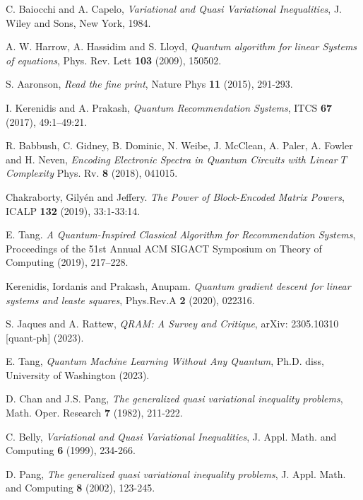 \documentclass[10pt,twoside,reqno]{amsart} %
\theoremstyle{plain}
\theoremstyle{definition}
\begin{document}
\bigskip

\begin{thebibliography}{0}

C. Baiocchi and A. Capelo, 
{\it Variational and Quasi Variational Inequalities}, 
J. Wiley and Sons, 
New York, 
1984.

A. W. Harrow, A. Hassidim and S. Lloyd,
{\it Quantum algorithm for linear Systems of equations},
Phys. Rev. Lett
{\bf 103} (2009),
150502.

S. Aaronson,
{\it Read the fine print},
Nature Phys
{\bf 11} (2015),
291-293.

I. Kerenidis and A. Prakash,
{\it Quantum Recommendation Systems},
ITCS
{\bf 67} (2017),
49:1--49:21.

R. Babbush, C. Gidney, B. Dominic, N. Weibe, J. McClean, A. Paler, A. Fowler
and H. Neven,
{\it Encoding Electronic Spectra in Quantum Circuits with Linear $T$ Complexity}
Phys. Rv.
{\bf 8} (2018),
041015.

Chakraborty, Gily{\'en} and Jeffery. {\it The Power of Block-Encoded Matrix
Powers}, ICALP {\bf 132} (2019), 33:1-33:14.

E. Tang. {\it A Quantum-Inspired Classical Algorithm for Recommendation Systems},
Proceedings of the 51st Annual ACM SIGACT Symposium on Theory of Computing (2019),
217--228.

Kerenidis, Iordanis and Prakash, Anupam. {\it Quantum gradient descent for
linear systems and leaste squares}, Phys.Rev.A {\bf 2} (2020), 022316.

S. Jaques and A. Rattew,
{\it QRAM: A Survey and Critique},
arXiv: 2305.10310 [quant-ph] (2023).

E. Tang,
{\it Quantum Machine Learning Without Any Quantum},
Ph.D. diss, University of Washington (2023).

D. Chan and J.S. Pang, 
{\it The generalized quasi variational inequality problems}, 
Math. Oper. Research 
{\bf 7} (1982), 
211-222.

C. Belly, 
{\it Variational and Quasi Variational Inequalities}, 
J. Appl. Math. and Computing 
{\bf 6} (1999), 
234-266.

D. Pang, 
{\it The generalized quasi variational inequality problems}, 
J. Appl. Math. and Computing 
{\bf 8} (2002), 
123-245.




\end{thebibliography}
\end{document}
